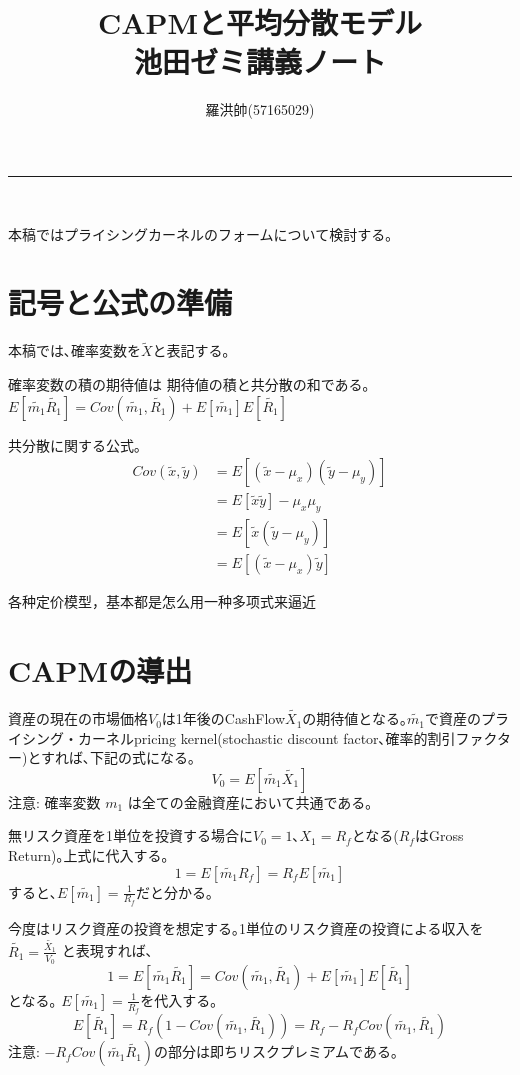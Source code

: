 \documentclass[uplatex,a4paper]{jsarticle}
\title{CAPMと平均分散モデル \\池田ゼミ講義ノート}
\author{羅洪帥(57165029)}
\date{}
\begin{document}
\maketitle
\hrule
\medskip　　

本稿ではプライシングカーネルのフォームについて検討する｡

\section{記号と公式の準備}
本稿では､確率変数を$\tilde{X}$と表記する｡


確率変数の積の期待値は 期待値の積と共分散の和である｡
$
E [\widetilde{m_1} \widetilde{R_1}] = Cov(\widetilde{m_1}, \widetilde{R_1}) +  E [\widetilde{m_1} ] E [ \widetilde{R_1}]
$

共分散に関する公式｡
\begin{align*}
Cov(\widetilde{x}, \widetilde{y})
& = E[(\widetilde{x} - \mu_x)(\widetilde{y} - \mu_y)]  \\
& = E[\tilde{x} \tilde{y}] - \mu_x \mu_y  \\
& = E[\tilde{x} (\tilde{y} - \mu_y  )]\\
& = E[(\tilde{x} - \mu_x  ) \tilde{y} ]
\end{align*}

各种定价模型，基本都是怎么用一种多项式来逼近

\section{CAPMの導出}

資産の現在の市場価格$V_0$は1年後のCashFlow$\widetilde{X_1}$の期待値となる｡$\widetilde{m_1}$で資産のプライシング・カーネルpricing kernel(stochastic discount factor､確率的割引ファクター)とすれば､下記の式になる｡
\begin{equation*}
V_0 = E [\widetilde{m_1} \widetilde{X_1}]
\end{equation*}
注意: 確率変数 $ m_{1}$  は全ての金融資産において共通である｡

無リスク資産を1単位を投資する場合に$V_0 = 1$､$X_1 = R_f$となる($R_f$はGross Return)｡上式に代入する｡
\begin{equation*}
1 = E [\widetilde{m_1} R_f] = R_f E [\widetilde{m_1}]
\end{equation*}
すると､$\displaystyle E [\widetilde{m_1}] = \frac{1}{R_f}$だと分かる｡

今度はリスク資産の投資を想定する｡1単位のリスク資産の投資による収入を
$\displaystyle \widetilde{R_1} = \frac{\widetilde{X_1}}{V_0}$
と表現すれば､
\begin{equation*}
1 = E [\widetilde{m_1} \widetilde{R_1}] = Cov(\widetilde{m_1}, \widetilde{R_1}) +  E [\widetilde{m_1} ] E [ \widetilde{R_1}]
\end{equation*}
となる｡
$ E [\widetilde{m_1}] = \frac{1}{R_f}$を代入する｡
\begin{equation*}
E [ \widetilde{R_1}] = R_f \left ( 1- Cov(\widetilde{m_1}, \widetilde{R_1})\right ) =
R_f - R_f Cov(\widetilde{m_1}, \widetilde{R_1})
\end{equation*}
注意: $ - R_f Cov(\widetilde{m_1} \widetilde{R_1})$の部分は即ちリスクプレミアムである｡
\end{document}
